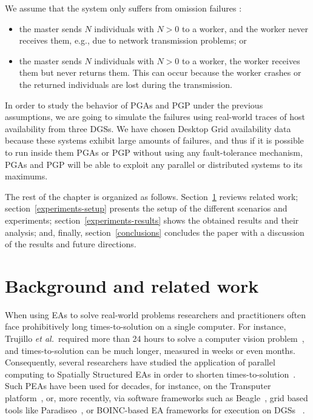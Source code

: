\documentclass[graybox]{sty/svmult}
\begin{document}
We assume that the system only suffers from omission failures \cite{distributed-systems}: 
\begin{itemize}
    \item the master sends $N$ individuals with $N>0$ to a worker, and the worker never receives them,
e.g., due to network transmission problems; or
    \item the master sends $N$ individuals with $N>0$ to a worker, the worker receives them but never
returns them. This can occur because the worker crashes or the returned individuals are lost during the transmission.
\end{itemize}   

In order to study the behavior of PGAs and PGP under the previous assumptions, we are going to simulate the failures using 
real-world traces of host availability from three DGSs. We have chosen Desktop Grid availability data because these systems
exhibit large amounts of failures, and thus if it is possible to run inside them PGAs or PGP without using any fault-tolerance
mechanism, PGAs and PGP will be able to exploit any parallel or distributed systems to its maximums.

The rest of the chapter is organized as follows. Section~\ref{related-work} reviews related
work; 
section~\ref{experiments-setup} presents the setup of the different
scenarios and experiments; 
section~\ref{experiments-results} shows the obtained results and their
analysis; and, finally, section~\ref{conclusions} concludes the paper with a discussion of the results and future directions.

\section{Background and related work}
\label{related-work}

When using EAs to solve real-world problems researchers and practitioners often face prohibitively
long times-to-solution on a single computer.  For instance,
Trujillo \emph{et al.}~required more than 24 hours to solve a computer
vision problem~\cite{ipgp2}, and times-to-solution can be
much longer, measured in weeks or even months. Consequently,
several researchers have studied the application of parallel
computing to Spatially Structured EAs in order to shorten
times-to-solution~\cite{Fernandez:PGP, spatially-structured-EAs, parallel-ga-survey}.
Such PEAs have been used for decades, for instance, on the Transputer
platform~\cite{transputer}, or, more recently, via software frameworks
such as Beagle~\cite{master-slave-framework-beagle}, grid based tools
like Paradiseo~\cite{grid-parallel-bioinspired-algorithms}, or BOINC-based EA frameworks for
execution on DGSs ~\cite{vmware-boinc-ipgp}.
\end{document}
